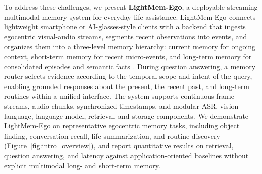To address these challenges, we present \textbf{LightMem-Ego}, a deployable streaming multimodal memory system for everyday-life assistance. 
LightMem-Ego connects lightweight smartphone or AI-glasses-style clients with a backend that ingests egocentric visual-audio streams, segments recent observations into events, and organizes them into a three-level memory hierarchy: current memory for ongoing context, short-term memory for recent micro-events, and long-term memory for consolidated episodes and semantic facts \cite{MemGPT, Mem0, LightMem, StructMem}. 
During question answering, a memory router selects evidence according to the temporal scope and intent of the query, enabling grounded responses about the present, the recent past, and long-term routines within a unified interface. 
The system supports continuous frame streams, audio chunks, synchronized timestamps, and modular ASR, vision-language, language model, retrieval, and storage components. 
We demonstrate LightMem-Ego on representative egocentric memory tasks, including object finding, conversation recall, life summarization, and routine discovery (Figure~\ref{fig:intro_overview}), and report quantitative results on retrieval, question answering, and latency against application-oriented baselines without explicit multimodal long- and short-term memory.





